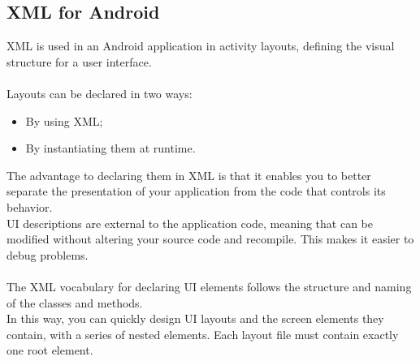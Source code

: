 \subsection{XML for Android}
\label{subsect:XML for Android}
XML is used in an Android application in activity layouts, defining the visual structure for a user interface. \\\\
Layouts can be declared in two ways:
\begin{itemize}
\item By using XML;
\item By instantiating them at runtime.
\end{itemize}
The advantage to declaring them in XML is that it enables you to better separate the presentation of your application from the code that controls its behavior. \\
UI descriptions are external to the application code, meaning that can be modified without altering your source code and recompile. This makes it easier to debug problems. \\\\
The XML vocabulary for declaring UI elements follows the structure and naming of the classes and methods.\\
In this way, you can quickly design UI layouts and the screen elements they contain, with a series of nested elements. Each layout file must contain exactly one root element.

